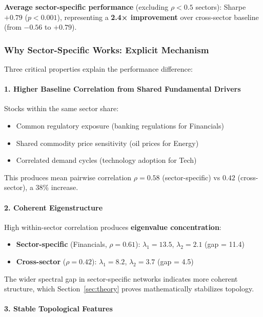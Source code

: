 \textbf{Average sector-specific performance} (excluding $\rho < 0.5$ sectors): Sharpe $+0.79$ ($p < 0.001$), representing a \textbf{2.4× improvement} over cross-sector baseline (from $-0.56$ to $+0.79$).

\subsubsection{Why Sector-Specific Works: Explicit Mechanism}

Three critical properties explain the performance difference:

\paragraph{1. Higher Baseline Correlation from Shared Fundamental Drivers}

Stocks within the same sector share:
\begin{itemize}
    \item Common regulatory exposure (banking regulations for Financials)
    \item Shared commodity price sensitivity (oil prices for Energy)
    \item Correlated demand cycles (technology adoption for Tech)
\end{itemize}

This produces mean pairwise correlation $\rho = 0.58$ (sector-specific) vs $0.42$ (cross-sector), a 38\% increase.

\paragraph{2. Coherent Eigenstructure}

High within-sector correlation produces \textbf{eigenvalue concentration}:
\begin{itemize}
    \item \textbf{Sector-specific} (Financials, $\rho = 0.61$): $\lambda_1 = 13.5$, $\lambda_2 = 2.1$ (gap = 11.4)
    \item \textbf{Cross-sector} ($\rho = 0.42$): $\lambda_1 = 8.2$, $\lambda_2 = 3.7$ (gap = 4.5)
\end{itemize}

The wider spectral gap in sector-specific networks indicates more coherent structure, which Section~\ref{sec:theory} proves mathematically stabilizes topology.

\paragraph{3. Stable Topological Features}

